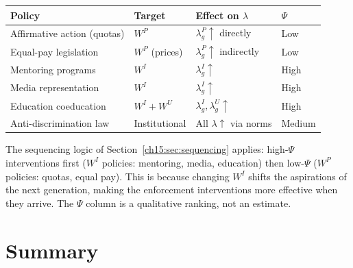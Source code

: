 \documentclass[../structural_economics_book.tex]{subfiles}
\begin{document}
\begin{remark}\label{ch18:prop:policy_attributes}
\begin{center}
\small
\begin{tabular}{llll}
\toprule
\textbf{Policy} & \textbf{Target} & \textbf{Effect on $\lambda$} & \textbf{$\Psi$} \\
\midrule
Affirmative action (quotas) & $W^P$ & $\lambda_g^P \uparrow$ directly & Low \\
Equal-pay legislation & $W^P$ (prices) & $\lambda_g^P \uparrow$ indirectly & Low \\
Mentoring programs & $W^I$ & $\lambda_g^I \uparrow$ & High \\
Media representation & $W^I$ & $\lambda_g^I \uparrow$ & High \\
Education coeducation & $W^I + W^U$ & $\lambda_g^I, \lambda_g^U \uparrow$ & High \\
Anti-discrimination law & Institutional & All $\lambda \uparrow$ via norms & Medium \\
\bottomrule
\end{tabular}
\end{center}

The sequencing logic of Section~\ref{ch15:sec:sequencing} applies: high-$\Psi$ interventions first ($W^I$ policies: mentoring, media, education) then low-$\Psi$ ($W^P$ policies: quotas, equal pay). This is because changing $W^I$ shifts the aspirations of the next generation, making the enforcement interventions more effective when they arrive. The $\Psi$ column is a qualitative ranking, not an estimate.
\end{remark}


\section{Summary}
\label{ch18:sec:summary}
\end{document}
